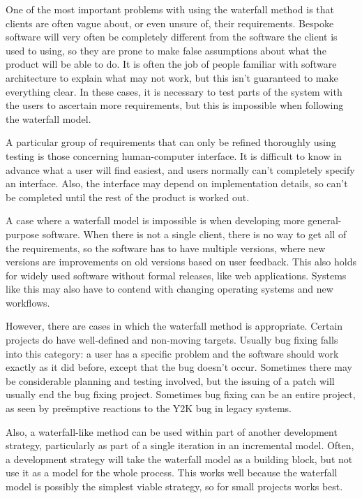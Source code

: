 \documentclass{article}
\begin{document}
One of the most important problems with using the waterfall method is that clients are often vague about, or even unsure of, their requirements. Bespoke software will very often be completely different from the software the client is used to using, so they are prone to make false assumptions about what the product will be able to do. It is often the job of people familiar with software architecture to explain what may not work, but this isn't guaranteed to make everything clear. In these cases, it is necessary to test parts of the system with the users to ascertain more requirements, but this is impossible when following the waterfall model.

A particular group of requirements that can only be refined thoroughly using testing is those concerning human-computer interface. It is difficult to know in advance what a user will find easiest, and users normally can't completely specify an interface. Also, the interface may depend on implementation details, so can't be completed until the rest of the product is worked out.

A case where a waterfall model is impossible is when developing more general-purpose software. When there is not a single client, there is no way to get all of the requirements, so the software has to have multiple versions, where new versions are improvements on old versions based on user feedback. This also holds for widely used software without formal releases, like web applications. Systems like this may also have to contend with changing operating systems and new workflows.

However, there are cases in which the waterfall method is appropriate. Certain projects do have well-defined and non-moving targets. Usually bug fixing falls into this category: a user has a specific problem and the software should work exactly as it did before, except that the bug doesn't occur. Sometimes there may be considerable planning and testing involved, but the issuing of a patch will usually end the bug fixing project. Sometimes bug fixing can be an entire project, as seen by pre\"emptive reactions to the Y2K bug in legacy systems.

Also, a waterfall-like method can be used within part of another development strategy, particularly as part of a single iteration in an incremental model. Often, a development strategy will take the waterfall model as a building block, but not use it as a model for the whole process. This works well because the waterfall model is possibly the simplest viable strategy, so for small projects works best.
\end{document}
